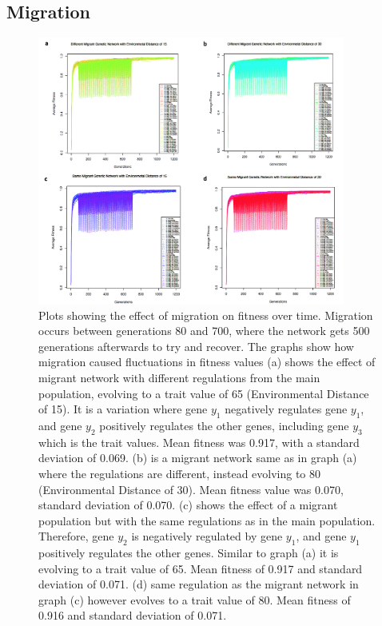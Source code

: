 \subsection{Migration}
\begin{figure}[h!]
    \centering
        \includegraphics[width=0.9\textwidth]{../Results/migration.jpg}
    \caption{Plots showing the effect of migration on fitness over time. Migration occurs between generations 80 and 700, where the network gets 500 generations afterwards to try and recover. The graphs show how migration caused fluctuations in fitness values (a) shows the effect of migrant network with different regulations from the main population, evolving to a trait value of 65 (Environmental Distance of 15). It is a variation where gene $y_1$ negatively regulates gene $y_1$, and gene $y_2$ positively regulates the other genes, including gene $y_3$ which is the trait values. Mean fitness was 0.917, with a standard deviation of 0.069. (b) is a migrant network same as in graph (a) where the regulations are different, instead evolving to 80 (Environmental Distance of 30). Mean fitness value was 0.070, standard deviation of 0.070. (c) shows the effect of a migrant population but with the same regulations as in the main population. Therefore, gene $y_2$ is negatively regulated by gene $y_1$, and gene $y_1$ positively regulates the other genes. Similar to graph (a) it is evolving to a trait value of 65. Mean fitness of 0.917 and standard deviation of 0.071. (d) same regulation as the migrant network in graph (c) however evolves to a trait value of 80. Mean fitness of 0.916 and standard deviation of 0.071.}
    \label{fig:With Migration}
\end{figure}
